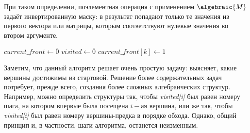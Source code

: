 При таком определении, поэлементная операция с применением $\algebraic{M}$ задаёт инвертированную маску: в результат попадают только те значения из первого вектора или матрицы, которым соответствуют нулевые значения во втором аргументе.

\begin{algorithm}
    $\mathit{current\_front} \leftarrow \overline{0}$\;
    $\mathit{visited} \leftarrow \overline{0}$\;
    $\mathit{current\_front}[k] \leftarrow 1$\;
    \;
    \caption{Алгоритм обхода в ширину в терминах линейной алгебры}
    \label{algo:BFS_linal}
\end{algorithm}

Заметим, что данный алгоритм решает очень простую задачу: выясняет, какие вершины достижимы из стартовой.
Решение более содержательных задач потребует, прежде всего, создания более сложных алгебраических структур.
Например, можно определить структуры так, чтобы \emph{visited[i]} был равен номеру шага, на котором впервые была посещена $i-$ая вершина,
или же так, чтобы \emph{visited[i]} был равен номеру вершины-предка в порядке обхода.
Однако, общий принцип и, в частности, шаги алгоритма, останется неизменным.


